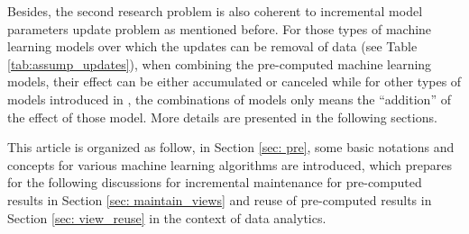 Besides, the second research problem is also coherent to incremental model parameters update problem as mentioned before. For those types of machine learning models over which the updates can be removal of data (see Table \ref{tab:assump_updates}), when combining the pre-computed machine learning models, their effect can be either accumulated or canceled while for other types of models introduced in \cite{deshpande2006mauvedb, gupta2015processing,koc2011incrementally}, the combinations of models only means the ``addition'' of the effect of those model. More details are presented in the following sections.

This article is organized as follow, in Section \ref{sec: pre}, some basic notations and concepts for various machine learning algorithms are introduced, which prepares for the following discussions for incremental maintenance for pre-computed results in Section \ref{sec: maintain_views} and reuse of pre-computed results in Section \ref{sec: view_reuse} in the context of data analytics.